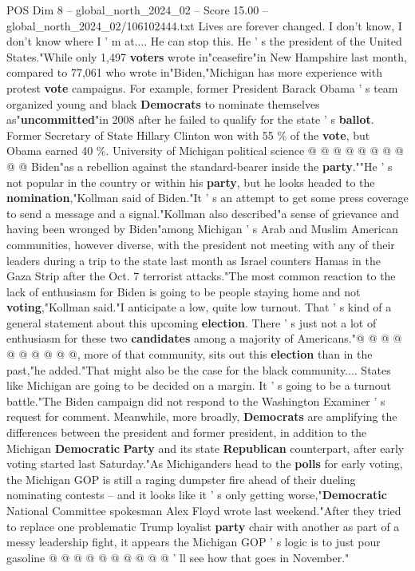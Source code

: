 \begin{textsample}{POS Dim 8 – global\_north\_2024\_02 – Score 15.00 – global\_north\_2024\_02/106102444.txt}
Lives are forever changed.
I don't know, I don't know where I ' m at....
He can stop this.
He ' s the president of the United States."While only 1,497 \textbf{voters} wrote in"ceasefire"in New Hampshire last month, compared to 77,061 who wrote in"Biden,"Michigan has more experience with protest \textbf{vote} campaigns.
For example, former President Barack Obama ' s team organized young and black \textbf{Democrats} to nominate themselves as"\textbf{uncommitted}"in 2008 after he failed to qualify for the state ' s \textbf{ballot}.
Former Secretary of State Hillary Clinton won with 55 \% of the \textbf{vote}, but Obama earned 40 \%.
University of Michigan political science @ @ @ @ @ @ @ @ @ @ Biden"as a rebellion against the standard-bearer inside the \textbf{party}.""He ' s not popular in the country or within his \textbf{party}, but he looks headed to the \textbf{nomination},"Kollman said of Biden."It ' s an attempt to get some press coverage to send a message and a signal."Kollman also described"a sense of grievance and having been wronged by Biden"among Michigan ' s Arab and Muslim American communities, however diverse, with the president not meeting with any of their leaders during a trip to the state last month as Israel counters Hamas in the Gaza Strip after the Oct. 7 terrorist attacks."The most common reaction to the lack of enthusiasm for Biden is going to be people staying home and not \textbf{voting},"Kollman said."I anticipate a low, quite low turnout.
That ' s kind of a general statement about this upcoming \textbf{election}.
There ' s just not a lot of enthusiasm for these two \textbf{candidates} among a majority of Americans."@ @ @ @ @ @ @ @ @ @, more of that community, sits out this \textbf{election} than in the past,"he added."That might also be the case for the black community....
States like Michigan are going to be decided on a margin.
It ' s going to be a turnout battle."The Biden campaign did not respond to the Washington Examiner ' s request for comment.
Meanwhile, more broadly, \textbf{Democrats} are amplifying the differences between the president and former president, in addition to the Michigan \textbf{Democratic} \textbf{Party} and its state \textbf{Republican} counterpart, after early voting started last Saturday."As Michiganders head to the \textbf{polls} for early voting, the Michigan GOP is still a raging dumpster fire ahead of their dueling nominating contests -- and it looks like it ' s only getting worse,"\textbf{Democratic} National Committee spokesman Alex Floyd wrote last weekend."After they tried to replace one problematic Trump loyalist \textbf{party} chair with another as part of a messy leadership fight, it appears the Michigan GOP ' s logic is to just pour gasoline @ @ @ @ @ @ @ @ @ @ ' ll see how that goes in November."

\end{textsample}
